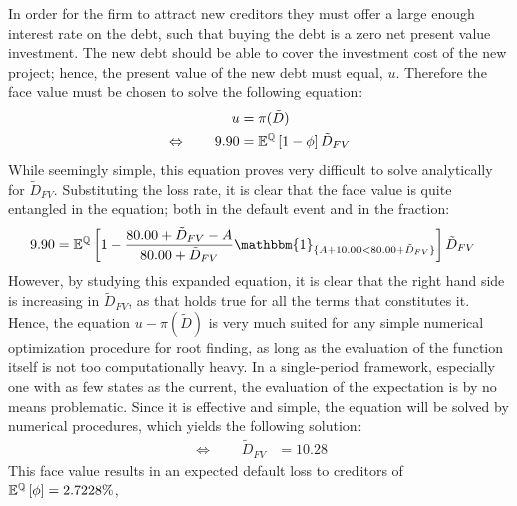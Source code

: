 \documentclass[main.tex]{subfiles}
\begin{document}
        In order for the firm to attract new creditors they must offer a large enough interest rate on the debt, 
        such that buying the debt is a zero net present value investment.
        The new debt should be able to cover the investment cost of the new project;
        hence, the present value of the new debt must equal, $u$.
        Therefore the face value must be chosen to solve the following equation:
            \begin{align}
                u &= \pi(\tilde{D}) \\
                \Leftrightarrow  \qquad
                9.90 &= \mathbb{E}^{\mathbb{Q}}\left[1 - \phi\right] \tilde{D}_{FV}
            \end{align}
        While seemingly simple, this equation proves very difficult to solve analytically for $\tilde{D}_{FV}$.
        Substituting the loss rate, it is clear that the face value is quite entangled in the equation;
        both in the default event and in the fraction:
            \begin{align}
                9.90
                &= 
                \mathbb{E}^{\rnmeasure}\left[
                    1 
                    - 
                    \frac{
                        80.00 + \tilde{D}_{FV} - A
                    }{
                        80.00 + \tilde{D}_{FV}
                    }
                    \mathbbm{1}_{\{A + 10.00 < 80.00 + \tilde{D}_{FV}\}} 
                \right] 
                \tilde{D}_{FV} 
            \end{align}
        However, by studying this expanded equation, it is clear that the right hand side 
        is increasing in $\tilde{D}_{FV}$, as that holds true for all the terms that constitutes it.
        Hence, the equation $u - \pi(\tilde{D})$ is very much suited for any simple numerical optimization procedure
        for root finding, as long as the evaluation of the function itself is not too computationally heavy.
        In a single-period framework, especially one with as few states as the current,
        the evaluation of the expectation is by no means problematic.
        Since it is effective and simple, the equation will be solved by numerical procedures, 
        which yields the following solution:
            \begin{align}
                \Leftrightarrow  \qquad
                \tilde{D}_{FV} &= 10.28
            \end{align}
        This face value results in an expected default loss to creditors of 
        $\mathbb{E}^{\mathbb{Q}}\left[\phi\right] = 2.7228\%$,
\end{document}
